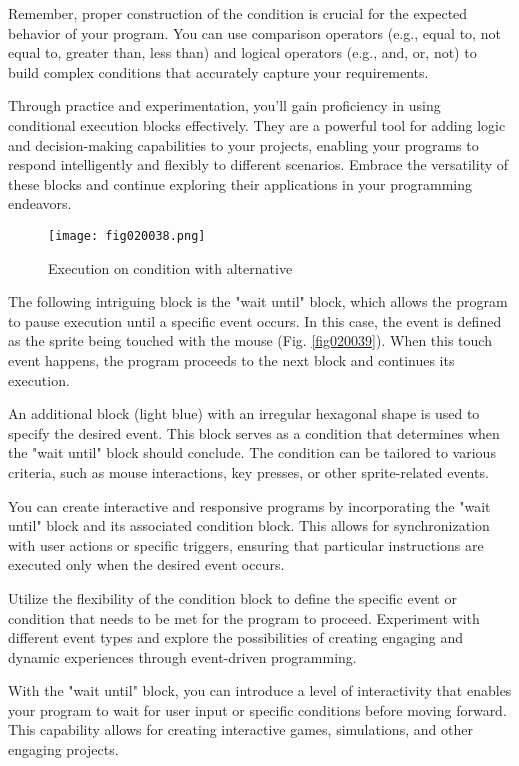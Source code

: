 Remember, proper construction of the condition is crucial for the expected behavior of your program. You can use comparison operators (e.g., equal to, not equal to, greater than, less than) and logical operators (e.g., and, or, not) to build complex conditions that accurately capture your requirements.

Through practice and experimentation, you'll gain proficiency in using conditional execution blocks effectively. They are a powerful tool for adding logic and decision-making capabilities to your projects, enabling your programs to respond intelligently and flexibly to different scenarios. Embrace the versatility of these blocks and continue exploring their applications in your programming endeavors.

\begin{figure}[H]
   \centering
   \texttt{[image: fig020038.png]}
   \caption{Execution on condition with alternative}
\label{fig020038}
\end{figure}

The following intriguing block is the "wait until" block, which allows the program to pause execution until a specific event occurs. In this case, the event is defined as the sprite being touched with the mouse (Fig. \ref{fig020039}). When this touch event happens, the program proceeds to the next block and continues its execution.

An additional block (light blue) with an irregular hexagonal shape is used to specify the desired event. This block serves as a condition that determines when the "wait until" block should conclude. The condition can be tailored to various criteria, such as mouse interactions, key presses, or other sprite-related events.

You can create interactive and responsive programs by incorporating the "wait until" block and its associated condition block. This allows for synchronization with user actions or specific triggers, ensuring that particular instructions are executed only when the desired event occurs.

Utilize the flexibility of the condition block to define the specific event or condition that needs to be met for the program to proceed. Experiment with different event types and explore the possibilities of creating engaging and dynamic experiences through event-driven programming.

With the "wait until" block, you can introduce a level of interactivity that enables your program to wait for user input or specific conditions before moving forward. This capability allows for creating interactive games, simulations, and other engaging projects.

